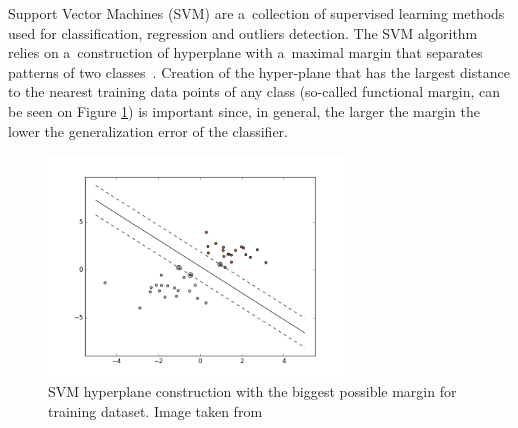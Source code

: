 Support Vector Machines (SVM) are a~collection of supervised learning methods used for classification, regression and outliers detection. The SVM algorithm relies on a~construction of hyperplane with a~maximal margin that separates patterns of two classes~\cite{CortesVapnik1995}. Creation of the hyper-plane that has the largest distance to the nearest training data points of any class (so-called functional margin, can be seen on Figure \ref{fig:svm_hyperplane_margin}) is important since, in general, the larger the margin the lower the generalization error of the classifier.

\begin{figure}[htp]
	\centering
	\includegraphics[width=0.7\textwidth]{Figures/svm_hyperplane_margin.png}
	\caption{SVM hyperplane construction with the biggest possible margin for training dataset. Image taken from \cite{Scikit-Learn_Website}}
	\label{fig:svm_hyperplane_margin}\vspace{-3pt}
\end{figure}

